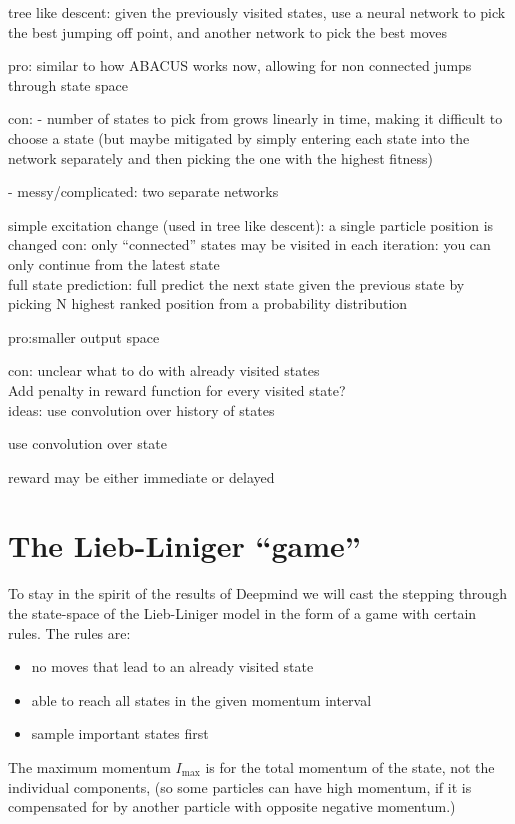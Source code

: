 \documentclass[11pt, a4paper]{report} %
\begin{document}
tree like descent: given the previously visited states, use a neural network to pick the best jumping off point, and another network to pick the best moves

pro: similar to how ABACUS works now, allowing for non connected jumps through state space

con: - number of states to pick from grows linearly in time, making it difficult to choose a state (but maybe mitigated by simply entering each state into the network separately and then picking the one with the highest fitness)

- messy/complicated: two separate networks

simple excitation change (used in tree like descent): a single particle position is changed
con: only ``connected'' states may be visited in each iteration: you can only continue from the latest state
\\
full state prediction: full predict the next state given the previous state by picking N highest ranked position from a probability distribution

pro:smaller output space

con: unclear what to do with already visited states
\\
Add penalty in reward function for every visited state?
\\
ideas:
use convolution over history of states

use convolution over state

reward may be either immediate or delayed

\section{The Lieb-Liniger ``game''}

To stay in the spirit of the results of Deepmind we will cast the stepping through the state-space of the Lieb-Liniger model in the form of a game with certain rules.
The rules are:
\begin{itemize}
  \item no moves that lead to an already visited state
  \item able to reach all states in the given momentum interval
  \item sample important states first
\end{itemize}

The maximum momentum $I_{\max}$ is for the total momentum of the state, not the individual components, (so some particles can have high momentum, if it is compensated for by another particle with opposite negative momentum.)
\end{document}
